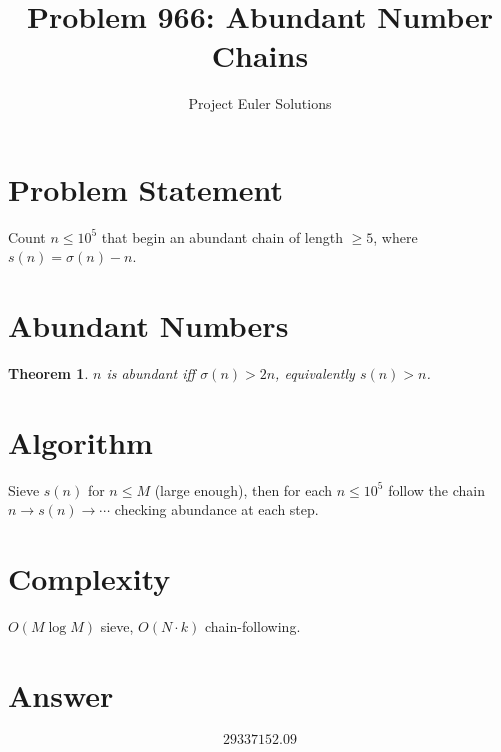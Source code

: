 \documentclass[11pt]{article}
\title{Problem 966: Abundant Number Chains}
\author{Project Euler Solutions}
\date{}
\newtheorem{theorem}{Theorem}
\begin{document}
\maketitle
\section{Problem Statement}
Count $n \le 10^5$ that begin an abundant chain of length $\ge 5$, where $s(n) = \sigma(n) - n$.
\section{Abundant Numbers}
\begin{theorem}
$n$ is abundant iff $\sigma(n) > 2n$, equivalently $s(n) > n$.
\end{theorem}
\section{Algorithm}
Sieve $s(n)$ for $n \le M$ (large enough), then for each $n \le 10^5$ follow the chain $n \to s(n) \to \cdots$ checking abundance at each step.
\section{Complexity}
$O(M \log M)$ sieve, $O(N \cdot k)$ chain-following.
\section{Answer}

\[
\boxed{29337152.09}
\]
\end{document}
